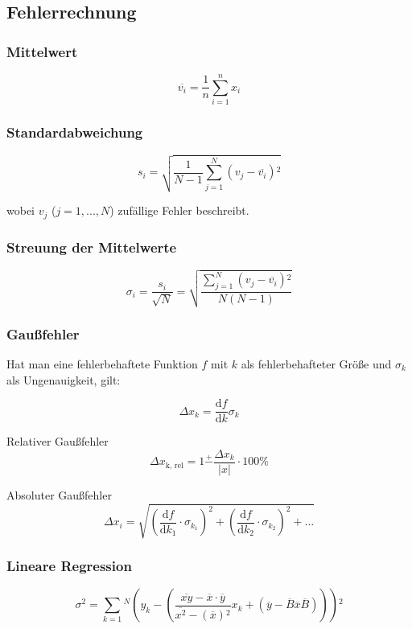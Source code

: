 \subsection{Fehlerrechnung}
\label{subsec:fehlerrechnung}

\subsubsection{Mittelwert}
\begin{equation}
\overline{v_i} = \frac{1}{n} \sum_{i=1}^n x_i
\end{equation}

\subsubsection{Standardabweichung}
\begin{equation}
s_i = \sqrt{\frac{1}{N - 1} \sum_{j=1}^N \left(v_j - \overline{v_i}\right){^2}}
\end{equation}

wobei $v_j$ ($j = 1, ..., N$) zufällige Fehler beschreibt.

\subsubsection{Streuung der Mittelwerte}
\begin{equation}
\sigma_i = \frac{s_i}{\sqrt{N}} = \sqrt{\frac{\sum_{j=1}^N \left(v_j - \overline{v_i}\right){^2}}{N \left(N - 1 \right)}}
\end{equation}

\subsubsection{Gaußfehler}
Hat man eine fehlerbehaftete Funktion $f$ mit $k$ als fehlerbehafteter Größe und $\sigma_k$ als Ungenauigkeit, gilt:

\begin{equation}
\Delta x_k = \frac{\mathrm{d}f}{\mathrm{d}k}\sigma_k
\end{equation}

Relativer Gaußfehler
\begin{equation}
\Delta x_\text{k, rel} = 1 \stackrel{+}{-} \frac{\Delta x_k}{|x|}\cdot 100\%
\end{equation}

Absoluter Gaußfehler
\begin{equation}
\Delta x_i = \sqrt{\left(\frac{\mathrm{d}f}{\mathrm{d}k_{1}}\cdot \sigma_{k_{1}}\right)^2 + \left(\frac{\mathrm{d}f}{\mathrm{d}k_{2}}\cdot \sigma_{k_{2}}\right)^2 + ...}
\end{equation}

\subsubsection{Lineare Regression}
\begin{equation}
\sigma {^2} = \sum_{k=1}{^N} \left(y_k - \left(\frac{\overline{xy} - \overline{x}\cdot\overline{y}}{\overline{x^2} - (\overline{x}){^2}}x_k + \left(\overline{y} - \overline{B}\overline{x}\overline{B}\right)\right)\right){^2}
\end{equation}
